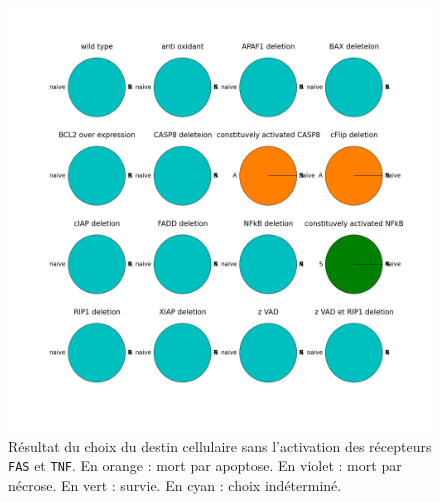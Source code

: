\documentclass[11pt, a4paper]{article}
\begin{document}
\begin{figure}[position]
    \begin{center}
        \includegraphics[scale=0.25]{tnf0_fas0}
        \caption{
            \label{tnf0_fas0}
            Résultat du choix du destin cellulaire sans l'activation des
            récepteurs \texttt{FAS} et \texttt{TNF}. En orange : mort par
            apoptose. En violet : mort par nécrose. En vert : survie. En cyan :
            choix indéterminé.
        }
    \end{center}
\end{figure}
\end{document}
